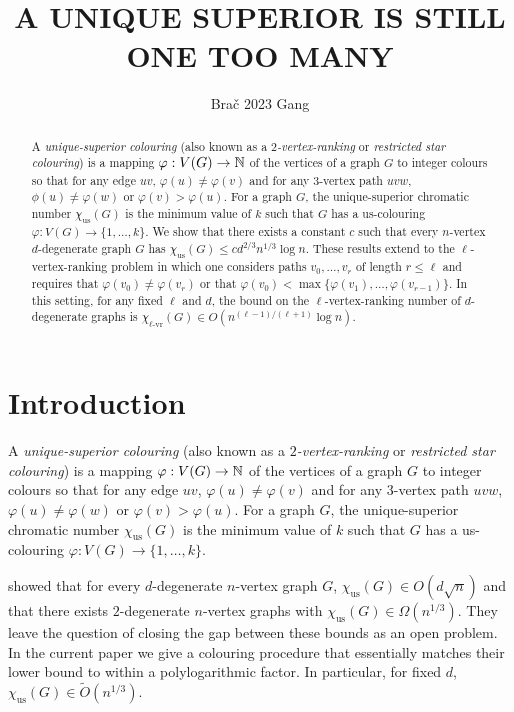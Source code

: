 \documentclass{patmorin}
\title{\MakeUppercase{A Unique Superior is Still One Too Many}}
\author{Bra\v{c} 2023 Gang}
\newcommand{\defin}[1]{\emph{\color{brightmaroon}#1}}
\newcommand{\rn}[1]{\chi_{\operatorname{#1-vr}}}
\newcommand{\trn}{\chi_{\mathrm{us}}}
\newcommand{\lrn}{\rn{\ell}}
\begin{document}
\maketitle

\begin{abstract}
  A \defin{unique-superior colouring} (also known as a \defin{$2$-vertex-ranking} or \defin{restricted star colouring}) is a mapping $\varphi:V(G)\to\mathbb{N}$ of the vertices of a graph $G$ to integer colours so that for any edge $uv$, $\varphi(u)\neq \varphi(v)$ and for any $3$-vertex path $uvw$, $\phi(u)\neq\varphi(w)$ or $\varphi(v)>\varphi(u)$.  For a graph $G$, the unique-superior chromatic number $\trn(G)$ is the minimum value of $k$ such that $G$ has a us-colouring $\varphi:V(G)\to\{1,\ldots,k\}$.  We show that there exists a constant $c$ such that every $n$-vertex $d$-degenerate graph $G$ has $\trn(G) \le cd^{2/3} n^{1/3}\log n$.  These results extend to the $\ell$-vertex-ranking problem in which one considers paths $v_0,\ldots,v_r$ of length $r\le \ell$ and requires that $\varphi(v_0)\neq\varphi(v_r)$ or that $\varphi(v_0)<\max\{\varphi(v_1),\ldots,\varphi(v_{r-1})\}$.  In this setting, for any fixed $\ell$ and $d$, the bound on the $\ell$-vertex-ranking number of $d$-degenerate graphs is $\lrn(G)\in O(n^{(\ell-1)/(\ell+1)}\log n)$.
\end{abstract}


%



\section{Introduction}

A \defin{unique-superior colouring} (also known as a \defin{$2$-vertex-ranking} or \defin{restricted star colouring}) is a mapping $\varphi:V(G)\to\mathbb{N}$ of the vertices of a graph $G$ to integer colours so that for any edge $uv$, $\varphi(u)\neq \varphi(v)$ and for any $3$-vertex path $uvw$, $\varphi(u)\neq\varphi(w)$ or $\varphi(v)>\varphi(u)$.  For a graph $G$, the unique-superior chromatic number $\trn(G)$ is the minimum value of $k$ such that $G$ has a us-colouring $\varphi:V(G)\to\{1,\ldots,k\}$.

\citet{karpas.neiman.ea:on} showed that for every $d$-degenerate $n$-vertex graph $G$, $\trn(G)\in O(d\sqrt{n})$ and that there exists $2$-degenerate $n$-vertex graphs with $\trn(G)\in\Omega(n^{1/3})$.  They leave the question of closing the gap between these bounds as an open problem. In the current paper we give a colouring procedure that essentially matches their lower bound to within a polylogarithmic factor.  In particular, for fixed $d$, $\trn(G)\in \tilde{O}(n^{1/3})$.
\end{document}
